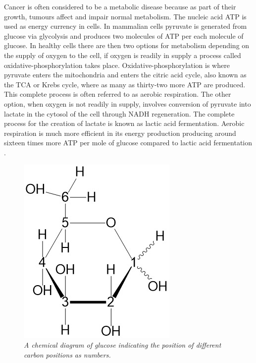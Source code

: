 Cancer is often considered to be a metabolic disease because as part of their growth, tumours affect and impair normal metabolism. The nucleic acid \ac{ATP} is used as energy currency in cells. In mammalian cells pyruvate is generated from glucose via glycolysis and produces two molecules of \ac{ATP} per each molecule of glucose. In healthy cells there are then two options for metabolism depending on the supply of oxygen to the cell, if oxygen is readily in supply a process called oxidative-phosphorylation takes place. Oxidative-phosphorylation is where pyruvate enters the mitochondria and enters the citric acid cycle, also known as the \ac{TCA} or Krebs cycle, where as many as thirty-two more \ac{ATP} are produced. This complete process is often referred to as aerobic respiration. The other option, when oxygen is not readily in supply, involves conversion of pyruvate into lactate in the cytosol of the cell through NADH regeneration. The complete process for the creation of lactate is known as lactic acid fermentation. Aerobic respiration is much more efficient in its energy production producing  around sixteen times more \ac{ATP} per mole of glucose compared to lactic acid fermentation \cite{Romero-Garcia2011TumorView}. 

\begin{figure}
    \centering
    \includegraphics[width=0.6\linewidth]{Figures/Intro/Normal_Glucose.jpg}
    \caption{\textit{A chemical diagram of glucose indicating the position of different carbon positions as numbers.}}
    \label{fig:intro:glucose}
\end{figure}

